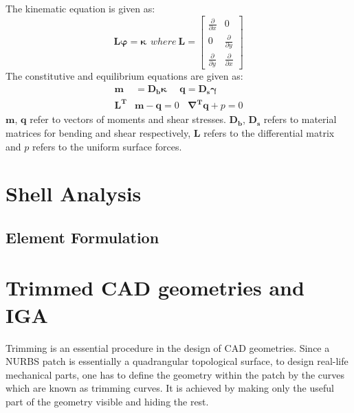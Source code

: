 \documentclass[12pt, a4paper]{report}
\begin{document}
The kinematic equation is given as: 
\begin{equation}
\boldsymbol{L}\boldsymbol{\varphi}=\boldsymbol{\kappa}~~where~ \boldsymbol{L} =\begin{bmatrix}
    \frac{\partial}{\partial x} &  0 \\
    0 & \frac{\partial}{\partial y}  \\
    \frac{\partial}{\partial y} & \frac{\partial}{\partial x}
\end{bmatrix}
\end{equation}
The constitutive and equilibrium equations are given as:
\begin{align}
    \boldsymbol{m}&=\boldsymbol{D_b}\boldsymbol{\kappa}~~~~~~\boldsymbol{q}=\boldsymbol{D_s}\boldsymbol{\gamma}\\
    \boldsymbol{L^T}&\boldsymbol{m}-\boldsymbol{q}= 0~~~~ \boldsymbol{\nabla^T}\boldsymbol{q}+p=0
\end{align}
$\boldsymbol{m}$, $\boldsymbol{q}$ refer to vectors of moments and shear stresses. $\boldsymbol{D_b}$, $\boldsymbol{D_s}$ refers to material matrices for bending and shear respectively, $\boldsymbol{L}$ refers to the differential matrix and $p$ refers to the uniform surface forces.


\chapter{Shell Analysis} \label{chap: Shell}

\section{Element Formulation}


\chapter{Trimmed CAD geometries and IGA} \label{chap: Trimmed IGA}
Trimming is an essential procedure in the design of CAD geometries. Since a NURBS patch is essentially a quadrangular topological surface, to design real-life mechanical parts, one has to define the geometry within the patch by the curves which are known as trimming curves. It is achieved by making only the useful part of the geometry visible and hiding the rest. 
\end{document}
